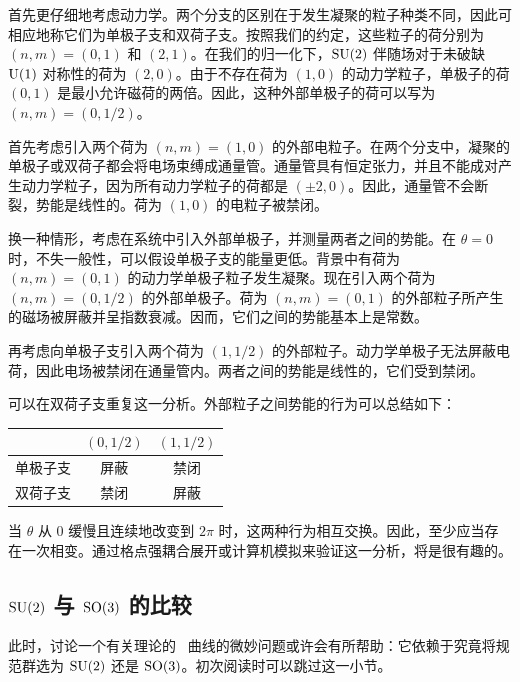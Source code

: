 首先更仔细地考虑动力学。两个分支的区别在于发生凝聚的粒子种类不同，因此可相应地称它们为单极子支和双荷子支。按照我们的约定，这些粒子的荷分别为 $(n,m)=(0,1)$ 和 $(2,1)$。在我们的归一化下，$\mathop{\mathrm{SU}}(2)$ 伴随场对于未破缺 ${\mathrm{U}}(1)$ 对称性的荷为 $(2,0)$。由于不存在荷为 $(1,0)$ 的动力学粒子，单极子的荷 $(0,1)$ 是最小允许磁荷的两倍。因此，这种外部单极子的荷可以写为 $(n,m)=(0,1/2)$。

首先考虑引入两个荷为 $(n,m)=(1,0)$ 的外部电粒子。在两个分支中，凝聚的单极子或双荷子都会将电场束缚成通量管。通量管具有恒定张力，并且不能成对产生动力学粒子，因为所有动力学粒子的荷都是 $(\pm2,0)$。因此，通量管不会断裂，势能是线性的。荷为 $(1,0)$ 的电粒子被禁闭。

换一种情形，考虑在系统中引入外部单极子，并测量两者之间的势能。在 $\theta=0$ 时，不失一般性，可以假设单极子支的能量更低。背景中有荷为 $(n,m)=(0,1)$ 的动力学单极子粒子发生凝聚。现在引入两个荷为 $(n,m)=(0,1/2)$ 的外部单极子。荷为 $(n,m)=(0,1)$ 的外部粒子所产生的磁场被屏蔽并呈指数衰减。因而，它们之间的势能基本上是常数。

再考虑向单极子支引入两个荷为 $(1,1/2)$ 的外部粒子。动力学单极子无法屏蔽电荷，因此电场被禁闭在通量管内。两者之间的势能是线性的，它们受到禁闭。

可以在双荷子支重复这一分析。外部粒子之间势能的行为可以总结如下：
\begin{center}
\begin{tabular}{r|cc}
& $(0,1/2)$ & $(1,1/2)$ \\
\hline
单极子支 & 屏蔽 & 禁闭 \\
双荷子支 & 禁闭 & 屏蔽
\end{tabular}
\end{center}
当 $\theta$ 从 $0$ 缓慢且连续地改变到 $2\pi$ 时，这两种行为相互交换。因此，至少应当存在一次相变。通过格点强耦合展开或计算机模拟来验证这一分析，将是很有趣的。

\subsection{$\mathop{\mathrm{SU}}(2)$ 与 $\mathop{\mathrm{SO}}(3)$ 的比较}
此时，讨论一个有关理论的 \SeibergWitten\ 曲线的微妙问题或许会有所帮助：它依赖于究竟将规范群选为 $\mathop{\mathrm{SU}}(2)$ 还是 $\mathop{\mathrm{SO}}(3)$。初次阅读时可以跳过这一小节。

